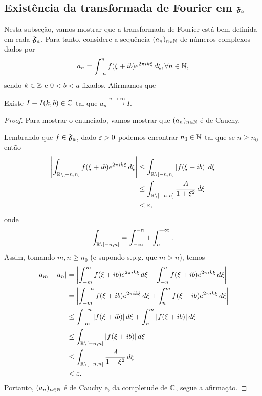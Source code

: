     \subsection{Existência da transformada de Fourier em \texorpdfstring{$\mathfrak{F}_a$}{Fa}}
        Nesta subseção, vamos mostrar que a transformada de Fourier está bem definida em cada $\mathfrak{F}_a$.
        Para tanto, considere a sequência $(a_n)_{n\in\mathbb{N}}$ de números complexos dados por
        \begin{equation*}
            a_n = \int_{-n}^n f(\xi + ib)e^{2\pi ik\xi} \, d\xi, \forall n\in\mathbb{N},
        \end{equation*}
        sendo $k\in\mathbb{Z}$ e $0<b<a$ fixados. Afirmamos que
        \begin{proposicao}
        \label{prop-transf-fourier-definida-fa}
            Existe $I \equiv I(k,b) \in\mathbb{C}$ tal que $a_n\xrightarrow{n\to\infty} I$.
        \end{proposicao}
        \begin{proof}
            Para mostrar o enunciado, vamos mostrar que $(a_n)_{n\in\mathbb{N}}$ é de Cauchy.
            
            Lembrando que $f\in\mathfrak{F}_a$, dado $\varepsilon>0$ podemos encontrar $n_0\in\mathbb{N}$ 
            tal que se $n \geq n_0$ então
            \begin{align*}
                \left| \int_{\mathbb{R}\setminus[-n,n]} f(\xi + ib)e^{2\pi ik\xi} \, d\xi \right| 
                &\leq \int_{\mathbb{R}\setminus[-n,n]} |f(\xi + ib)| \, d\xi \\
                &\leq \int_{\mathbb{R}\setminus[-n,n]} \frac{A}{1+\xi^2} \, d\xi \\
                &< \varepsilon,
            \end{align*}
            onde
            \begin{equation*}
                \int_{\mathbb{R}\setminus[-n,n]} = \int_{-\infty}^{-n} + \int_n^{+\infty}.
            \end{equation*}
            Assim, tomando $m,n\geq n_0$ (e supondo s.p.g. que $m>n$), temos
            \begin{align*}
                |a_m - a_n| &= \left| \int_{-m}^m f(\xi + ib)e^{2\pi ik\xi} \, d\xi 
                            - \int_{-n}^n f(\xi + ib)e^{2\pi ik\xi} \, d\xi \right| \\
                            &= \left| \int_{-m}^{-n} f(\xi + ib)e^{2\pi ik\xi} \, d\xi 
                            + \int_{n}^m f(\xi + ib)e^{2\pi ik\xi} \, d\xi \right| \\
                            &\leq \int_{-m}^{-n} |f(\xi + ib)| \, d\xi 
                            + \int_{n}^m |f(\xi + ib)| \, d\xi \\
                            &\leq \int_{\mathbb{R}\setminus[-n,n]} |f(\xi + ib)| \, d\xi \\
                            &\leq \int_{\mathbb{R}\setminus[-n,n]} \frac{A}{1+\xi^2} \, d\xi \\
                            &< \varepsilon.
            \end{align*}
            Portanto, $(a_n)_{n\in\mathbb{N}}$ é de Cauchy e, da completude de $\mathbb{C}$, segue a afirmação.
        \end{proof}

